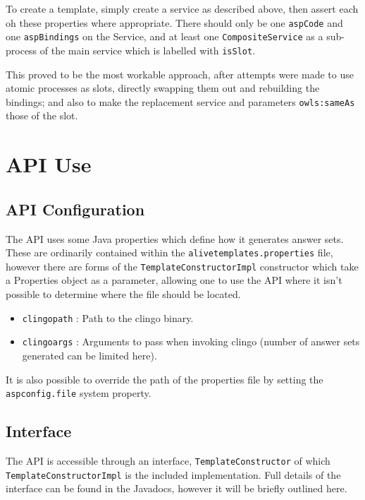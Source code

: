 \documentclass{llncs}
\begin{document}
 To create a template, simply create a service as described above, then assert each 
 oh these properties where appropriate. There should only be one \texttt{aspCode} and 
 one \texttt{aspBindings} on the Service, and at least one \texttt{CompositeService} 
 as a sub-process of the main service which is labelled with \texttt{isSlot}.

 This proved to be the most workable approach, after attempts were made to use 
 atomic processes as slots, directly swapping them out and rebuilding the bindings; and 
 also to make the replacement service and parameters \texttt{owls:sameAs} those of the 
 slot.

\section{API Use}
\subsection{API Configuration}
 The API uses some Java properties which define how it generates answer sets. 
 These are ordinarily contained within the \texttt{alivetemplates.properties} 
 file, however there are forms of the \texttt{TemplateConstructorImpl} 
 constructor which take a Properties object as a parameter, allowing one to 
 use the API where it isn't possible to determine where the file should be 
 located.

 \begin{itemize}
 	\item \texttt{clingopath} : Path to the clingo binary.
 	\item \texttt{clingoargs} : Arguments to pass when invoking clingo (number of answer sets generated can be limited here).
 \end{itemize}

 It is also possible to override the path of the properties file by setting 
 the \texttt{aspconfig.file} system property.

\subsection{Interface}
 The API is accessible through an interface, \texttt{TemplateConstructor} of which 
 \texttt{TemplateConstructorImpl} is the included implementation. Full details of 
 the interface can be found in the Javadocs, however it will be briefly outlined 
 here.
\end{document}
